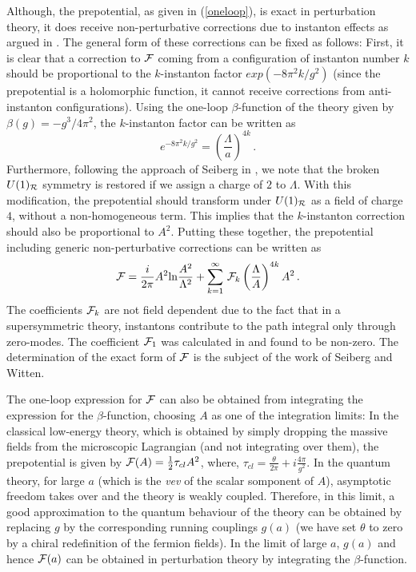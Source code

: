 Although, the prepotential, as given in (\ref{oneloop}), is exact in
perturbation theory, it does receive non-perturbative corrections due
to instanton effects as argued in \cite{Seiberg88}. The general form
of these corrections can be fixed as follows: First, it is clear that
a correction to ${\cal F}$ coming from a configuration of instanton
number $k$ should be proportional to the $k$-instanton factor
$exp(-8\pi^2k/g^2)$ (since the prepotential is a holomorphic function,
it cannot receive corrections from anti-instanton configurations). 
Using the one-loop $\beta$-function of the theory given by
$\beta(g)=-g^3/4\pi^2$, the $k$-instanton factor can be written as 
$$
e^{-8\pi^2k/g^2} = \left(\frac{\Lambda}{a}\right)^{4k}\,.
$$
Furthermore, following the approach of Seiberg in \cite{Seiberg-n,
Seiberg-poh}, we note that the broken $U(1)_{\cal R}$ symmetry is
restored if we assign a charge of $2$ to $\Lambda$. With this
modification, the prepotential should transform under $U(1)_{\cal R}$
as a field of charge $4$, without a non-homogeneous term. This implies
that the $k$-instanton correction should also be proportional to
$A^2$. Putting these together, the prepotential including generic
non-perturbative corrections can be written as
$$
{\cal F}=\frac{i}{2\pi} A^2 {\rm ln} \frac{A^2}{\Lambda^2}
+\sum_{k=1}^\infty\,{\cal F}_k\left(\frac{\Lambda}{A}\right)^{4k}A^2\,.
$$
The coefficients ${\cal F}_k$ are not field dependent due to the fact
that in a supersymmetric theory, instantons contribute to the path
integral only through zero-modes\cite{DD}. The coefficient ${\cal
F}_1$ was calculated in \cite{Seiberg88} and found to be non-zero. The
determination of the exact form of ${\cal F}$ is the subject of the
work of Seiberg and Witten. 

The one-loop expression for ${\cal F}$ can also be obtained from
integrating the expression for the $\beta$-function, choosing $A$ as
one of the integration limits: In the classical low-energy theory,
which is obtained by simply dropping the massive fields from the
microscopic Lagrangian (and not integrating over them), the
prepotential is given by ${\cal F}(A)=\frac{1}{2} \tau_{cl}A^2$,
where, $\tau_{cl}=\frac{\theta}{2\pi}+i\frac{4\pi}{g^2}$. In the
quantum theory, for large $a$ (which is the {\it vev} of the scalar
somponent of $A$), asymptotic freedom takes over and the theory is
weakly coupled. Therefore, in this limit, a good approximation to the
quantum behaviour of the theory can be obtained by replacing $g$ by
the corresponding running couplings $g(a)$ (we have set $\theta$ to
zero by a chiral redefinition of the fermion fields).  In the limit of
large $a$, $g(a)$ and hence ${\cal F}(a)$ can be obtained in
perturbation theory by integrating the $\beta$-function.

